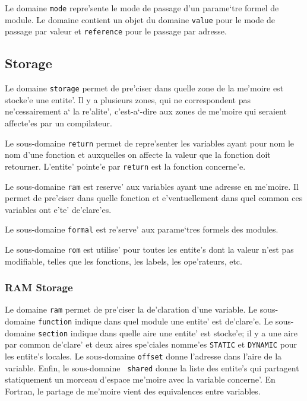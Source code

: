 {
Le domaine \verb/mode/ repre'sente le mode de passage d'un parame`tre
formel de module. Le domaine contient un objet du domaine \verb/value/
pour le mode de passage par valeur et \verb/reference/ pour le passage
par adresse.
}

\subsection{Storage}
\label{subsection-storage}

{
Le domaine \verb/storage/ permet de pre'ciser dans quelle zone de la
me'moire est stocke'e une entite'. Il y a plusieurs zones, qui ne
correspondent pas ne'cessairement a` la re'alite', c'est-a`-dire aux
zones de me'moire qui seraient affecte'es par un compilateur.

Le sous-domaine \verb/return/ permet de repre'senter les variables ayant
pour nom le nom d'une fonction et auxquelles on affecte la valeur que la
fonction doit retourner. L'entite' pointe'e par \verb/return/ est la
fonction concerne'e.

Le sous-domaine \verb/ram/ est reserve' aux variables ayant une adresse
en me'moire. Il permet de pre'ciser dans quelle fonction et
e'ventuellement dans quel common ces variables ont e'te' de'clare'es.

Le sous-domaine \verb/formal/ est re'serve' aux parame`tres formels des
modules.

Le sous-domaine \verb/rom/ est utilise' pour toutes les entite's dont la
valeur n'est pas modifiable, telles que les fonctions, les labels, les
ope'rateurs, etc.
}

\subsubsection{RAM Storage}
\label{subsubsection-ram}

{
Le domaine \verb/ram/ permet de pre'ciser la de'claration d'une
variable. Le sous-domaine \verb/function/ indique dans quel module une
entite' est de'clare'e. Le sous-domaine \verb/section/ indique dans
quelle aire une entite' est stocke'e; il y a une aire par common
de'clare' et deux aires spe'ciales nomme'es \verb/STATIC/ et
\verb/DYNAMIC/ pour les entite's locales. Le sous-domaine \verb/offset/
donne l'adresse dans l'aire de la variable. Enfin, le sous-domaine {\tt
shared} donne la liste des entite's qui partagent statiquement un
morceau d'espace me'moire avec la variable concerne'. En Fortran, le
partage de me'moire vient des equivalences entre variables.  }


